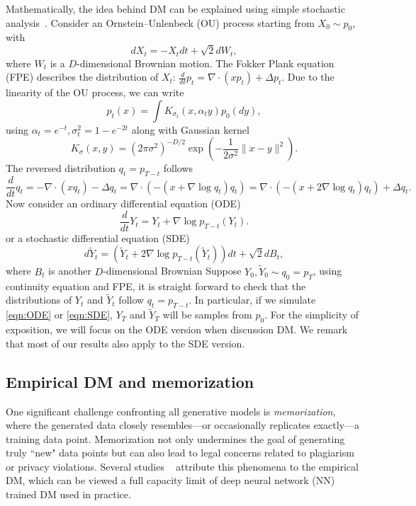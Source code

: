 \documentclass{article}
\begin{document}
Mathematically, the idea behind DM can be explained using simple stochastic analysis~\cite{song2020score}.  Consider an Ornstein--Unlenbeck (OU) process starting from $X_0\sim p_0$, with 
\begin{equation}
\label{eqn:forward}
dX_t=-X_tdt+\sqrt{2}dW_t,     
\end{equation}
where $W_t$ is a $D$-dimensional Brownian motion.
The Fokker Plank equation (FPE) describes the distribution of $X_t$: $\tfrac{d}{dt}p_t=\nabla \cdot (x p_t)+\Delta p_t$. Due to the linearity of the OU process, we can write
\begin{equation}
\label{eqn:popdensity}
p_t(x)=\int K_{\sigma_t}(x, \alpha_t y)p_0(dy),    
\end{equation}
using $\alpha_t=e^{-t},\sigma^2_t=1-e^{-2t}$ along with Gaussian kernel 
\[
K_{\sigma}(x,y)=(2\pi \sigma^2)^{-D/2} \exp\left(-\frac{1}{2\sigma^2}\|x-y\|^2\right). 
\]
The reversed distribution $q_{t}=p_{T-t}$ follows 
\[
\frac{d}{dt}q_t=-\nabla \cdot (x q_t)-\Delta q_t=\nabla \cdot (-(x+\nabla \log q_t)q_t)=\nabla \cdot (-(x+2\nabla \log q_t)q_t)+\Delta q_t. 
\]
Now consider an ordinary differential equation (ODE)
\begin{equation}
\label{eqn:ODE}
\frac{d}{dt}Y_t=Y_t+\nabla \log p_{T-t}(Y_t). 
\end{equation}
or a stochastic differential equation (SDE)
\begin{equation}
\label{eqn:SDE}
d\widetilde{Y}_t=(\widetilde{Y}_t+2\nabla \log p_{T-t}(\widetilde{Y}_t)) dt+\sqrt{2}dB_t,
\end{equation}
where $B_t$ is another $D$-dimensional Brownian
Suppose $Y_0,\widetilde{Y}_0\sim q_{0}=p_T$, using continuity equation and FPE, it is straight forward to check that the distributions of $Y_t$ and $\widetilde{Y}_t$ follow $q_t=p_{T-t}$. In particular, if we simulate \eqref{eqn:ODE} or \eqref{eqn:SDE}, $Y_T$ and $\widetilde{Y}_T$ will be samples from $p_0$. For the simplicity of exposition, we will focus on the ODE version when discussion DM. We remark that most of our results also apply to the SDE version. 

\subsection{Empirical DM and memorization}
One significant challenge confronting all generative models is \emph{memorization}, where the generated data closely resembles—or occasionally replicates exactly—a training data point. Memorization not only undermines the goal of generating truly ``new" data points but can also lead to legal concerns related to plagiarism or privacy violations. Several studies ~\cite{pidstrigach2022score,li2024good, lu2023mathematical} attribute this phenomena to the empirical DM, which can be viewed a full capacity limit of deep neural network (NN) trained DM used in practice.
\end{document}
